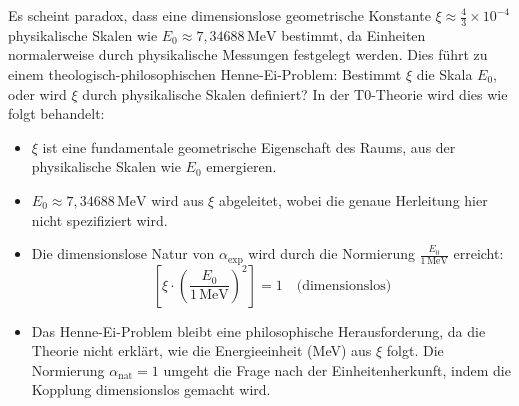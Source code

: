 \documentclass[12pt,a4paper]{article}
\theoremstyle{definition}
\begin{document}
Es scheint paradox, dass eine dimensionslose geometrische Konstante \(\xi \approx \frac{4}{3} \times 10^{-4}\) physikalische Skalen wie \(E_0 \approx 7{,}34688 \, \text{MeV}\) bestimmt, da Einheiten normalerweise durch physikalische Messungen festgelegt werden. Dies führt zu einem theologisch-philosophischen Henne-Ei-Problem: Bestimmt \(\xi\) die Skala \(E_0\), oder wird \(\xi\) durch physikalische Skalen definiert? In der T0-Theorie wird dies wie folgt behandelt:
\begin{itemize}
	\item \(\xi\) ist eine fundamentale geometrische Eigenschaft des Raums, aus der physikalische Skalen wie \(E_0\) emergieren.
	\item \(E_0 \approx 7{,}34688 \, \text{MeV}\) wird aus \(\xi\) abgeleitet, wobei die genaue Herleitung hier nicht spezifiziert wird.
	\item Die dimensionslose Natur von \(\alpha_{\text{exp}}\) wird durch die Normierung \(\frac{E_0}{1 \, \text{MeV}}\) erreicht:
	\[
	\left[\xi \cdot \left(\frac{E_0}{1 \, \text{MeV}}\right)^2\right] = 1 \quad \text{(dimensionslos)}
	\]
	\item Das Henne-Ei-Problem bleibt eine philosophische Herausforderung, da die Theorie nicht erklärt, wie die Energieeinheit (MeV) aus \(\xi\) folgt. Die Normierung \(\alpha_{\text{nat}} = 1\) umgeht die Frage nach der Einheitenherkunft, indem die Kopplung dimensionslos gemacht wird.
\end{itemize}
\end{document}
